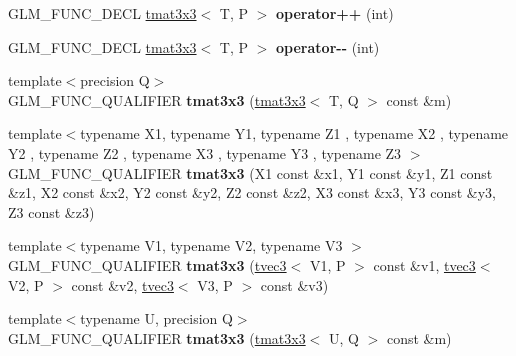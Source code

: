 \begin{DoxyCompactItemize}
\item 
\hypertarget{structglm_1_1detail_1_1tmat3x3_a42b606493a76f7246e3c4b6a0e10b064}{G\-L\-M\-\_\-\-F\-U\-N\-C\-\_\-\-D\-E\-C\-L \hyperlink{structglm_1_1detail_1_1tmat3x3}{tmat3x3}$<$ T, P $>$ {\bfseries operator++} (int)}\label{structglm_1_1detail_1_1tmat3x3_a42b606493a76f7246e3c4b6a0e10b064}

\item 
\hypertarget{structglm_1_1detail_1_1tmat3x3_a9a9c2ddae87b15a9a7d7000dcd41e27a}{G\-L\-M\-\_\-\-F\-U\-N\-C\-\_\-\-D\-E\-C\-L \hyperlink{structglm_1_1detail_1_1tmat3x3}{tmat3x3}$<$ T, P $>$ {\bfseries operator-\/-\/} (int)}\label{structglm_1_1detail_1_1tmat3x3_a9a9c2ddae87b15a9a7d7000dcd41e27a}

\item 
\hypertarget{structglm_1_1detail_1_1tmat3x3_a2b14034fffb8d3dd7f1d6d24131f7510}{{\footnotesize template$<$precision Q$>$ }\\G\-L\-M\-\_\-\-F\-U\-N\-C\-\_\-\-Q\-U\-A\-L\-I\-F\-I\-E\-R {\bfseries tmat3x3} (\hyperlink{structglm_1_1detail_1_1tmat3x3}{tmat3x3}$<$ T, Q $>$ const \&m)}\label{structglm_1_1detail_1_1tmat3x3_a2b14034fffb8d3dd7f1d6d24131f7510}

\item 
\hypertarget{structglm_1_1detail_1_1tmat3x3_a6bc248bf277f1e4c97480b964301a9e2}{{\footnotesize template$<$typename X1, typename Y1, typename Z1 , typename X2 , typename Y2 , typename Z2 , typename X3 , typename Y3 , typename Z3 $>$ }\\G\-L\-M\-\_\-\-F\-U\-N\-C\-\_\-\-Q\-U\-A\-L\-I\-F\-I\-E\-R {\bfseries tmat3x3} (X1 const \&x1, Y1 const \&y1, Z1 const \&z1, X2 const \&x2, Y2 const \&y2, Z2 const \&z2, X3 const \&x3, Y3 const \&y3, Z3 const \&z3)}\label{structglm_1_1detail_1_1tmat3x3_a6bc248bf277f1e4c97480b964301a9e2}

\item 
\hypertarget{structglm_1_1detail_1_1tmat3x3_a4093d2793f9a8895d7632b8163849670}{{\footnotesize template$<$typename V1, typename V2, typename V3 $>$ }\\G\-L\-M\-\_\-\-F\-U\-N\-C\-\_\-\-Q\-U\-A\-L\-I\-F\-I\-E\-R {\bfseries tmat3x3} (\hyperlink{structglm_1_1detail_1_1tvec3}{tvec3}$<$ V1, P $>$ const \&v1, \hyperlink{structglm_1_1detail_1_1tvec3}{tvec3}$<$ V2, P $>$ const \&v2, \hyperlink{structglm_1_1detail_1_1tvec3}{tvec3}$<$ V3, P $>$ const \&v3)}\label{structglm_1_1detail_1_1tmat3x3_a4093d2793f9a8895d7632b8163849670}

\item 
\hypertarget{structglm_1_1detail_1_1tmat3x3_a5a59337ed9a816f87aa1c16300c670f8}{{\footnotesize template$<$typename U, precision Q$>$ }\\G\-L\-M\-\_\-\-F\-U\-N\-C\-\_\-\-Q\-U\-A\-L\-I\-F\-I\-E\-R {\bfseries tmat3x3} (\hyperlink{structglm_1_1detail_1_1tmat3x3}{tmat3x3}$<$ U, Q $>$ const \&m)}\label{structglm_1_1detail_1_1tmat3x3_a5a59337ed9a816f87aa1c16300c670f8}


\end{DoxyCompactItemize}
